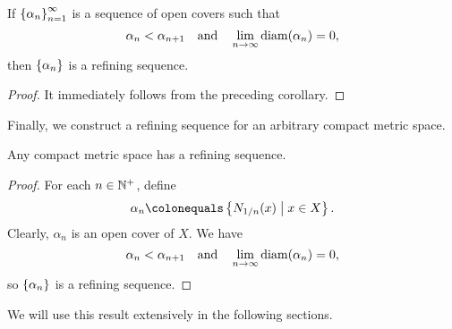 \documentclass[12pt,twoside,draft]{book}
\begin{document}
\begin{corollary}
  If $\left \{ \alpha_n \right \}^{\infty}_{n = 1}$ is a sequence of open covers such that
  \begin{equation*}
    \alpha_n < \alpha_{n+1} 
    \quad\mbox{and}\quad
    \lim\limits_{n \to \infty} \mathrm{diam}(\alpha_n) = 0,
  \end{equation*}
  then $\left \{ \alpha_n \right \}$ is a refining sequence.
  \begin{proof}
    It immediately follows from the preceding corollary.
  \end{proof}
\end{corollary}
Finally, we construct a refining sequence for an arbitrary compact metric space.
\begin{corollary}
  Any compact metric space has a refining sequence.
  \begin{proof}
    For each $n \in \mathbb{N}^+$, define
    \begin{equation*}
      \mathcal{\alpha}_n \ceq \setst{\oball{1/n}{x}}{x \in X}.
    \end{equation*}
    Clearly, $\mathcal{\alpha}_n$ is an open cover of $X$.
    We have
    \begin{equation*}
      \mathcal{\alpha}_n < \mathcal{\alpha}_{n+1}
      \quad\mbox{and}\quad
      \lim\limits_{n \to \infty} \mathrm{diam}(\alpha_n) = 0,
    \end{equation*}
    so $\left \{ \alpha_n \right \}$ is a refining sequence.
  \end{proof}
\end{corollary}
We will use this result extensively in the following sections.
\end{document}
